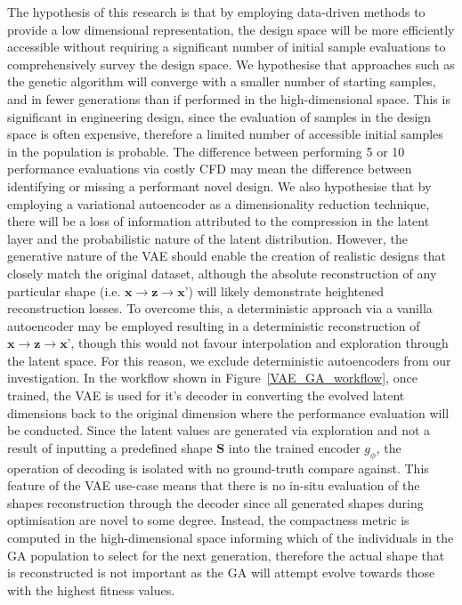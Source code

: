 \documentclass{article}
\begin{document}
The hypothesis of this research is that by employing data-driven methods to provide a low dimensional representation, the design space will be more efficiently accessible without requiring a significant number of initial sample evaluations to comprehensively survey the design space. We hypothesise that approaches such as the genetic algorithm will converge with a smaller number of starting samples, and in fewer generations than if performed in the high-dimensional space. This is significant in engineering design, since the evaluation of samples in the design space is often expensive, therefore a limited number of accessible initial samples in the population is probable. The difference between performing 5 or 10 performance evaluations via costly CFD may mean the difference between identifying or missing a performant novel design. We also hypothesise that by employing a variational autoencoder as a dimensionality reduction technique, there will be a loss of information attributed to the compression in the latent layer and the probabilistic nature of the latent distribution. However, the generative nature of the VAE should enable the creation of realistic designs that closely match the original dataset, although the absolute reconstruction of any particular shape (i.e. $\textbf{x} \rightarrow \textbf{z} \rightarrow \textbf{x'}$) will likely demonstrate heightened reconstruction losses. To overcome this, a deterministic approach via a vanilla autoencoder may be employed resulting in a deterministic reconstruction of $\textbf{x}\rightarrow\textbf{z}\rightarrow\textbf{x'}$, though this would not favour interpolation and exploration through the latent space. For this reason, we exclude deterministic autoencoders from our investigation.  In the workflow shown in Figure~\ref{VAE_GA_workflow}, once trained, the VAE is used for it's decoder in converting the evolved latent dimensions back to the original dimension where the performance evaluation will be conducted. Since the latent values are generated via exploration and not a result of inputting a predefined shape $\textbf{S}$ into the trained encoder $g_\phi$, the operation of decoding is isolated with no ground-truth compare against. This feature of the VAE use-case means that there is no in-situ evaluation of the shapes reconstruction through the decoder since all generated shapes during optimisation are novel to some degree. Instead, the compactness metric is computed in the high-dimensional space informing which of the individuals in the GA population to select for the next generation, therefore the actual shape that is reconstructed is not important as the GA will attempt evolve towards those with the highest fitness values.
\end{document}
